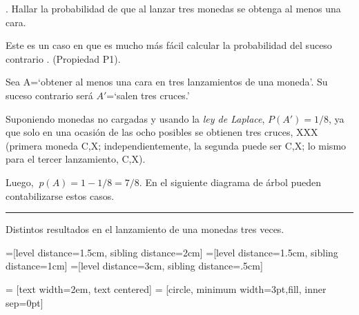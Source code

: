 \begin{example}
.	Hallar la probabilidad de que al lanzar tres monedas se obtenga al menos una cara.

\vspace{4mm} Este es un caso en que es mucho más fácil calcular la probabilidad del suceso contrario	. (Propiedad P1).

\vspace{2mm} Sea A=`obtener al menos una cara en tres lanzamientos de una moneda'. Su suceso contrario será $A'$=`salen tres cruces.'

\vspace{2mm} Suponiendo monedas no cargadas y usando la \emph{ley de Laplace}, $P(A')=1/8$, ya que solo en una ocasión de las ocho posibles se obtienen tres cruces, XXX (primera moneda C,X; independientemente, la segunda puede ser C,X; lo mismo para el tercer lanzamiento, C,X).

\vspace{2mm} Luego, $\ p(A)=1-1/8=7/8$. En el siguiente diagrama de árbol pueden contabilizarse estos casos.

	
\textcolor{gris}{\rule{50mm}{0.1mm}}

\begin{footnotesize}
\textcolor{gris}{Distintos resultados en el lanzamiento de una monedas tres veces.}

=[level distance=1.5cm, sibling distance=2cm]
=[level distance=1.5cm, sibling distance=1cm]
=[level distance=3cm, sibling distance=.5cm]

 = [text width=2em, text centered]
 = [circle, minimum width=3pt,fill, inner sep=0pt]
\begin{center}
\end{center}		
\end{footnotesize}	
\end{example}	
	

